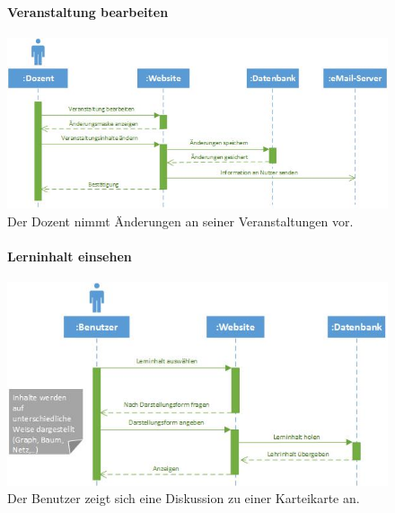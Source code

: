 \documentclass[12pt,a4paper]{article}
\begin{document}
\begin{figure}[H]
	\centering
	\paragraph{Veranstaltung bearbeiten}
	\includegraphics[width=\textwidth]{Bilder/Sequenzdiagramme/VeranstaltungBearbeiten1.jpg}
	\caption{Der Dozent nimmt Änderungen an seiner Veranstaltungen vor.}
	\label{SzVeranstaltungBearbeiten}
\end{figure}
\begin{figure}[H]
	\centering
	\paragraph{Lerninhalt einsehen}
	\includegraphics[width=\textwidth]{Bilder/Sequenzdiagramme/LerninhalteEinsehen1.jpg}
	\caption{Der Benutzer zeigt sich eine Diskussion zu einer Karteikarte an.}
	\label{SzLerninhaltEinsehen}
\end{figure}
\end{document}
